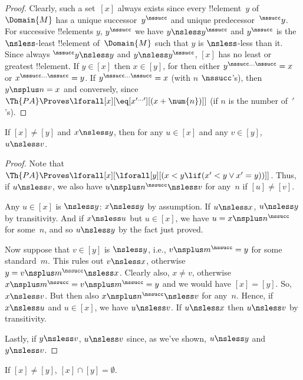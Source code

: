 \documentclass[../../../include/open-logic-section]{subfiles}
\begin{document}
\begin{proof}
Clearly, such a set~$[x]$ always exists since every !!{element}~$y$ of
$\Domain{M}$ has a unique successor~$y^\nssucc$ and unique
predecessor~$^\nssucc y$. For successive !!{element}s $y$, $y^\nssucc$
we have $y \nsless y^\nssucc$ and $y^\nssucc$ is the $\nsless$-least
!!{element} of~$\Domain{M}$ such that $y$ is $\nsless$-less than it.
Since always $^\nssucc y \nsless y$ and $y \nsless y^\nssucc$, $[x]$
has no least or greatest !!{element}. If $y \in [x]$ then $x \in [y]$,
for then either $y^{\nssucc\dots\nssucc} = x$ or
$x^{\nssucc\dots\nssucc} = y$.  If $y^{\nssucc\dots\nssucc} = x$ (with
$n$ $\nssucc$'s), then $y \nsplus n = x$ and conversely, since
$\Th{PA} \Proves \lforall[x][\eq[x^{\prime\dots\prime}][(x +
    \num{n})]]$ (if $n$ is the number of~$\prime$'s).
\end{proof}

\begin{prop}
If $[x] \neq [y]$ and $x \nsless y$, then for any $u \in [x]$ and any
$v \in [y]$, $u \nsless v$.
\end{prop}

\begin{proof}
Note that $\Th{PA} \Proves \lforall[x][\lforall[y][(x < y \lif (x' < y
    \lor x' = y))]]$. Thus, if $u \nsless v$, we also have $u \nsplus
n^\nssucc \nsless v$ for any~$n$ if $[u] \neq [v]$.

Any $u \in [x]$ is $\nsless y$: $x \nsless y$ by assumption. If $u
\nsless x$, $u \nsless y$ by transitivity. And if $x \nsless u$ but $u
\in [x]$, we have $u = x\nsplus n^\nssucc$ for some~$n$, and so $u
\nsless y$ by the fact just proved.
  
Now suppose that $v \in [y]$ is $\nsless y$, i.e., $v \nsplus
m^\nssucc = y$ for some standard~$m$. This rules out $v \nsless x$,
otherwise $y = v \nsplus m^\nssucc \nsless x$. Clearly also, $x \neq
v$, otherwise $x \nsplus m^\nssucc = v \nsplus m^\nssucc = y$ and we
would have $[x] = [y]$. So, $x \nsless v$. But then also $x \nsplus
n^\nssucc \nsless v$ for any~$n$. Hence, if $x \nsless u$ and $u \in
[x]$, we have $u \nsless v$. If $u \nsless x$ then $u \nsless v$ by
transitivity.

Lastly, if $y \nsless v$, $u \nsless v$ since, as we've shown, $u
\nsless y$ and $y \nsless v$.
\end{proof}

\begin{cor}
If $[x] \neq [y]$, $[x] \cap [y] = \emptyset$.
\end{cor}
\end{document}
